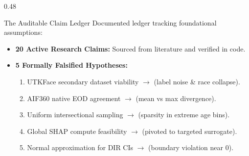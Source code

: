 \begin{frame}
\begin{columns}[T]
    \begin{column}{0.48\textwidth}
      \begin{successcard}{The Auditable Claim Ledger}
        \scriptsize
        Documented ledger tracking foundational assumptions:
        \vspace{0.05cm}
        \begin{itemize}\scriptsize
          \item \textbf{20 Active Research Claims:} Sourced from literature and verified in code.
          \item \textbf{5 Formally Falsified Hypotheses:}
            \begin{enumerate}\tiny
              \item UTKFace secondary dataset viability $\to$  (label noise \& race collapse).
              \item AIF360 native EOD agreement $\to$  (mean vs max divergence).
              \item Uniform intersectional sampling $\to$  (sparsity in extreme age bins).
              \item Global SHAP compute feasibility $\to$  (pivoted to targeted surrogate).
              \item Normal approximation for DIR CIs $\to$  (boundary violation near 0).
            \end{enumerate}
        \end{itemize}
      \end{successcard}
    \end{column}
  \end{columns}
\end{frame}

